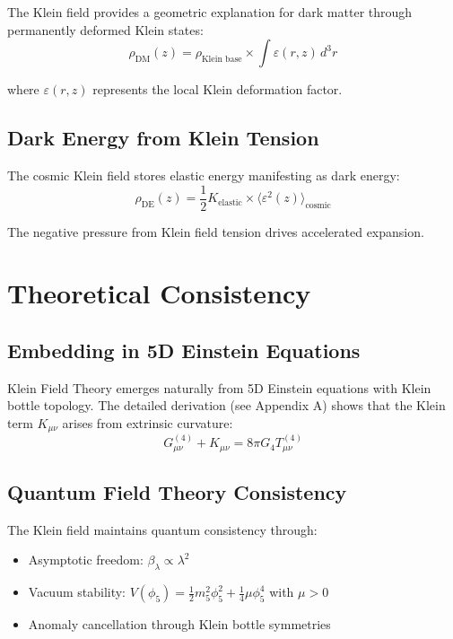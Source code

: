 \documentclass[12pt]{iopart}
\begin{document}
The Klein field provides a geometric explanation for dark matter through permanently deformed Klein states:
\begin{equation}
\rho_{\text{DM}}(z) = \rho_{\text{Klein base}} \times \int \varepsilon(r,z) \, d^3r
\label{eq:dark_matter}
\end{equation}

where $\varepsilon(r,z)$ represents the local Klein deformation factor.

\subsection{Dark Energy from Klein Tension}

The cosmic Klein field stores elastic energy manifesting as dark energy:
\begin{equation}
\rho_{\text{DE}}(z) = \frac{1}{2} K_{\text{elastic}} \times \langle\varepsilon^2(z)\rangle_{\text{cosmic}}
\label{eq:dark_energy}
\end{equation}

The negative pressure from Klein field tension drives accelerated expansion.

\section{Theoretical Consistency}

\subsection{Embedding in 5D Einstein Equations}

Klein Field Theory emerges naturally from 5D Einstein equations with Klein bottle topology. The detailed derivation (see Appendix A) shows that the Klein term $K_{\mu\nu}$ arises from extrinsic curvature:
\begin{equation}
G_{\mu\nu}^{(4)} + K_{\mu\nu} = 8\pi G_4 T_{\mu\nu}^{(4)}
\label{eq:5d_einstein}
\end{equation}

\subsection{Quantum Field Theory Consistency}

The Klein field maintains quantum consistency through:
\begin{itemize}
\item Asymptotic freedom: $\beta_\lambda \propto \lambda^2$
\item Vacuum stability: $V(\phi_5) = \frac{1}{2}m_5^2\phi_5^2 + \frac{1}{4}\mu\phi_5^4$ with $\mu > 0$
\item Anomaly cancellation through Klein bottle symmetries
\end{itemize}
\end{document}
